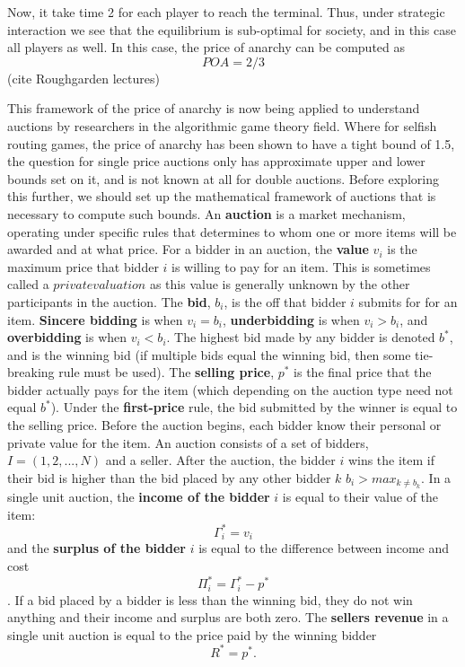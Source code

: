 \documentclass[12pt,twoside]{reedthesis}
\begin{document}
Now, it take time 2 for each player to reach the terminal. Thus, under strategic interaction we see that the equilibrium is sub-optimal for society, and in this case all players as well. In this case, the price of anarchy can be computed as $$POA = 2/3$$ (cite Roughgarden lectures)

This framework of the price of anarchy is now being applied to understand auctions by researchers in the algorithmic game theory field. Where for selfish routing games, the price of anarchy has been shown to have a tight bound of 1.5, the question for single price auctions only has approximate upper and lower bounds set on it, and is not known at all for double auctions. Before exploring this further, we should set up the mathematical framework of auctions that is necessary to compute such bounds. An \textbf{auction} is a market mechanism, operating under specific rules that determines to whom one or more items will be awarded and at what price. For a bidder in an auction, the \textbf{value} $v_i$ is the maximum price that bidder $i$ is willing to pay for an item. This is sometimes called a $private valuation$ as this value is generally unknown by the other participants in the auction. The \textbf{bid}, $b_i$, is the off that bidder $i$ submits for for an item. \textbf{Sincere bidding} is when $v_i = b_i$, \textbf{underbidding} is when $v_i > b_i$, and \textbf{overbidding} is when $v_i < b_i$. The highest bid made by any bidder is denoted $b^*$, and is the winning bid (if multiple bids equal the winning bid, then some tie-breaking rule must be used). The \textbf{selling price}, $p^*$ is the final price that the bidder actually pays for the item (which depending on the auction type need not equal $b^*$). Under the \textbf{first-price} rule, the bid submitted by the winner is equal to the selling price. Before the auction begins, each bidder know their personal or private value for the item. An auction consists of a set of bidders, $I = (1,2, ...,N)$ and a seller. After the auction, the bidder $i$ wins the item if their bid is higher than the bid placed by any other bidder $k$ $b_i > max_{k \neq b_k}$. In a single unit auction, the \textbf{income of the bidder} $i$ is equal to their value of the item: $$ \Gamma_i^* = v_i$$ and the \textbf{surplus of the bidder} $i$ is equal to the difference between income and cost $$ \Pi_i^* = \Gamma_i^* - p^*$$. If a bid placed by a bidder is less than the winning bid, they do not win anything and their income and surplus are both zero. The \textbf{sellers revenue} in a single unit auction is equal to the price paid by the winning bidder $$ R^* = p^*.$$ 
\end{document}
